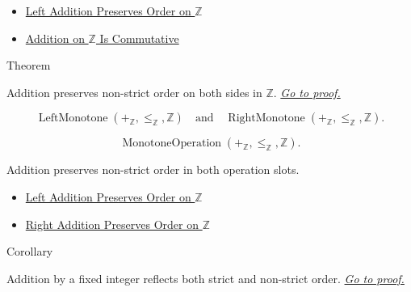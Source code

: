 \begin{dependencies}
\begin{itemize}
  \item \hyperref[thm:left-addition-preserves-order-on-z]{Left Addition Preserves Order on $\mathbb{Z}$}
  \item \hyperref[thm:addition-on-z-commutative]{Addition on $\mathbb{Z}$ Is Commutative}
\end{itemize}
\end{dependencies}

\begin{theorembox}{Theorem}
\begin{theorem}
\label{thm:addition-preserves-order-on-z}
Addition preserves non-strict order on both sides in $\mathbb{Z}$.
\hyperref[prf:addition-preserves-order-on-z]{\textit{Go to proof.}}
\end{theorem}
\end{theorembox}

\begin{remark*}
\[
\operatorname{LeftMonotone}(+_{\mathbb{Z}},\le_{\mathbb{Z}},\mathbb{Z})
\quad\text{and}\quad
\operatorname{RightMonotone}(+_{\mathbb{Z}},\le_{\mathbb{Z}},\mathbb{Z}).
\]
\end{remark*}

\begin{remark*}
\[
\operatorname{MonotoneOperation}(+_{\mathbb{Z}},\le_{\mathbb{Z}},\mathbb{Z}).
\]
\end{remark*}

\begin{remark*}[Interpretation]
Addition preserves non-strict order in both operation slots.
\end{remark*}

\begin{dependencies}
\begin{itemize}
  \item \hyperref[thm:left-addition-preserves-order-on-z]{Left Addition Preserves Order on $\mathbb{Z}$}
  \item \hyperref[cor:right-addition-preserves-order-on-z]{Right Addition Preserves Order on $\mathbb{Z}$}
\end{itemize}
\end{dependencies}

\begin{corollarybox}{Corollary}
\begin{corollary}
\label{cor:addition-reflects-order-on-z}
Addition by a fixed integer reflects both strict and non-strict order.
\hyperref[prf:addition-reflects-order-on-z]{\textit{Go to proof.}}
\end{corollary}
\end{corollarybox}


